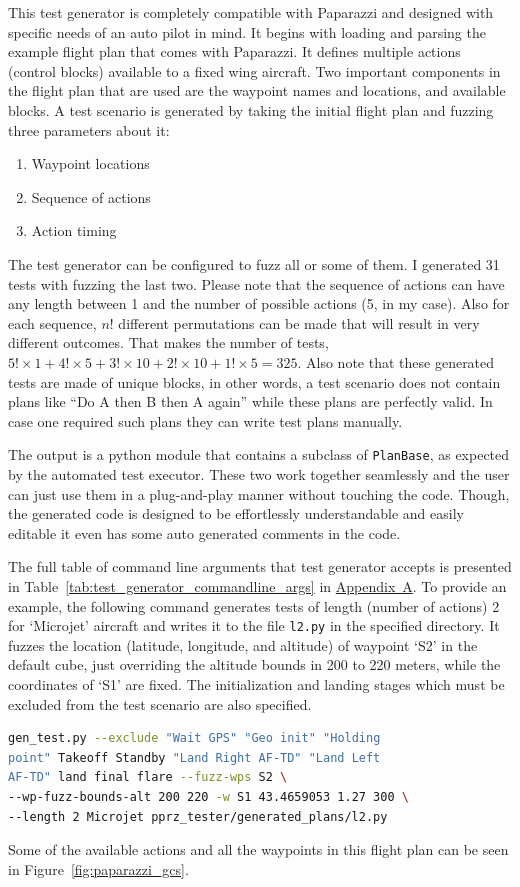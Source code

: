 This test generator is completely compatible with Paparazzi and designed with specific needs of an auto pilot in mind. It begins with loading and parsing the example flight plan that comes with Paparazzi. It defines multiple actions (control blocks) available to a fixed wing aircraft. Two important components in the flight plan that are used are the waypoint names and locations, and available blocks. A test scenario is generated by taking the initial flight plan and fuzzing three parameters about it:
\begin{enumerate}
    \item Waypoint locations
    \item Sequence of actions 
    \item Action timing
\end{enumerate}

The test generator can be configured to fuzz all or some of them. I generated 31 tests with fuzzing the last two. Please note that the sequence of actions can have any length between 1 and the number of possible actions (5, in my case). Also for each sequence, $n!$ different permutations can be made that will result in very different outcomes. That makes the number of tests, $5!\times1+4!\times5+3!\times10+2!\times10+1!\times5=325$. Also note that these generated tests are made of unique blocks, in other words, a test scenario does not contain plans like ``Do A then B then A again'' while these plans are perfectly valid. In case one required such plans they can write test plans manually.

The output is a python module that contains a subclass of \verb|PlanBase|, as expected by the automated test executor. These two work together seamlessly and the user can just use them in a plug-and-play manner without touching the code. Though, the generated code is designed to be effortlessly understandable and easily editable it even has some auto generated comments in the code.

The full table of command line arguments that test generator accepts is presented in Table~\ref{tab:test_generator_commandline_args} in \hyperref[appendixa]{Appendix~A}. To provide an example, the following command generates tests of length (number of actions) 2 for `Microjet' aircraft and writes it to the file \verb|l2.py| in the specified directory. It fuzzes the location (latitude, longitude, and altitude) of waypoint `S2' in the default cube, just overriding the altitude bounds in 200 to 220 meters, while the coordinates of `S1' are fixed. The initialization and landing stages which must be excluded from the test scenario are also specified. 
\begin{lstlisting}[language=bash]
gen_test.py --exclude "Wait GPS" "Geo init" "Holding 
point" Takeoff Standby "Land Right AF-TD" "Land Left 
AF-TD" land final flare --fuzz-wps S2 \
--wp-fuzz-bounds-alt 200 220 -w S1 43.4659053 1.27 300 \
--length 2 Microjet pprz_tester/generated_plans/l2.py
\end{lstlisting}
Some of the available actions and all the waypoints in this flight plan can be seen in Figure~\ref{fig:paparazzi_gcs}.
